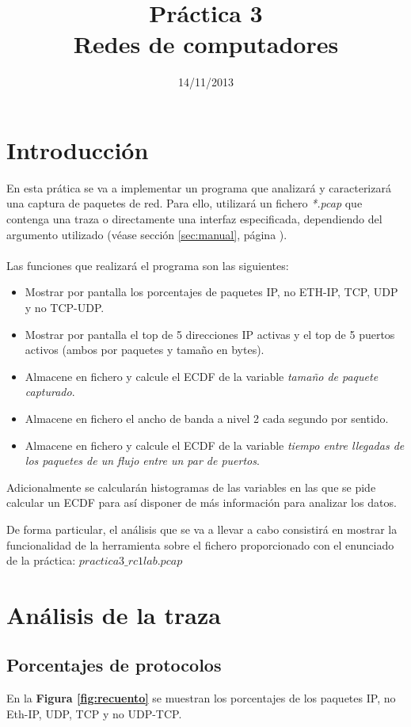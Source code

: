 \documentclass[a4paper, 11pt]{article}	%
\title{Práctica 3\\Redes de computadores}						%
\author{\enriquename \and \guillermoname}						%
\date{14/11/2013}												%
\begin{document}
\maketitle			%
\newpage				%
\tableofcontents		%
\newpage				%

\section{Introducción}	%
En esta prática se va a implementar un programa que analizará y caracterizará una captura de paquetes de red. Para ello, utilizará un fichero \textit{*.pcap} que contenga una traza o directamente una interfaz especificada, dependiendo del argumento utilizado (véase sección \ref{sec:manual}, página \pageref{sec:manual}).
\\\\
Las funciones que realizará el programa son las siguientes:
\begin{itemize}
\item Mostrar por pantalla los porcentajes de paquetes IP, no ETH-IP, TCP, UDP y no TCP-UDP.
\item Mostrar por pantalla el top de 5 direcciones IP activas y el top de 5 puertos activos  (ambos por paquetes y tamaño en bytes).
\item Almacene en fichero y calcule el ECDF de la variable \textit{tamaño de paquete capturado}.
\item Almacene en fichero el ancho de banda a nivel 2 cada segundo por sentido.
\item Almacene en fichero y calcule el ECDF de la variable \textit{tiempo entre llegadas de los paquetes de un flujo entre un par de puertos}.
\end{itemize}

Adicionalmente se calcularán histogramas de las variables en las que se pide calcular un ECDF para así disponer de más información para analizar los datos.

De forma particular, el análisis que se va a llevar a cabo consistirá en mostrar la funcionalidad de la herramienta sobre el fichero proporcionado con el enunciado de la práctica: \textit{$practica3\_ rc1lab.pcap$}

\section{Análisis de la traza}
\subsection{Porcentajes de protocolos}
En la \textbf{Figura \ref{fig:recuento}} se muestran los porcentajes de los paquetes IP, no Eth-IP, UDP, TCP y no UDP-TCP.
\end{document}
